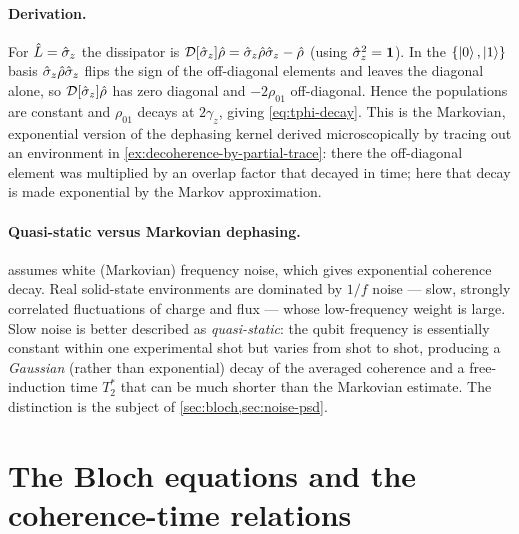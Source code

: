 \paragraph{Derivation.}
For $\hat{L}=\hat\sigma_z$ the dissipator is
$\mathcal D[\hat\sigma_z]\hat{\rho}=\hat\sigma_z\hat{\rho}\hat\sigma_z-\hat{\rho}$
(using $\hat\sigma_z^2=\mathbf{1}$). In the
$\{\ket0,\ket1\}$ basis $\hat\sigma_z\hat{\rho}\hat\sigma_z$ flips the
sign of the off-diagonal elements and leaves the diagonal alone, so
$\mathcal D[\hat\sigma_z]\hat{\rho}$ has zero diagonal and
$-2\rho_{01}$ off-diagonal. Hence the populations are constant and
$\rho_{01}$ decays at $2\gamma_z$, giving \cref{eq:tphi-decay}. This
is the Markovian, exponential version of the dephasing kernel
derived microscopically by tracing out an environment in
\cref{ex:decoherence-by-partial-trace}: there the off-diagonal
element was multiplied by an overlap factor that decayed in time;
here that decay is made exponential by the Markov approximation.

\paragraph{Quasi-static versus Markovian dephasing.}
 assumes white (Markovian) frequency noise, which
gives exponential coherence decay. Real solid-state environments
are dominated by $1/f$ noise --- slow, strongly correlated
fluctuations of charge and flux --- whose low-frequency weight is
large. Slow noise is better described as \emph{quasi-static}: the
qubit frequency is essentially constant within one experimental
shot but varies from shot to shot, producing a \emph{Gaussian}
(rather than exponential) decay of the averaged coherence and a
free-induction time $T_2^*$ that can be much shorter than the
Markovian estimate. The distinction is the subject of
\cref{sec:bloch,sec:noise-psd}.

\section{The Bloch equations and the coherence-time relations}
\label{sec:bloch-equations}


